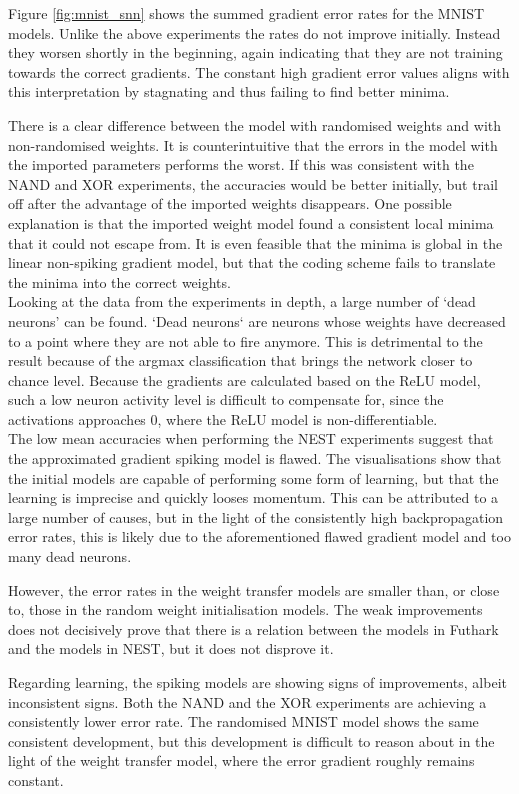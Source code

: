 \documentclass[report.tex]{subfiles}
\begin{document}
Figure \ref{fig:mnist_snn} shows the summed gradient error rates for the MNIST
models.
Unlike the above experiments the rates do not improve initially.
Instead they worsen shortly in the beginning, again indicating that they are not training towards
the correct gradients.
The constant high gradient error values aligns with this interpretation by
stagnating and thus failing to find better minima.

There is a clear difference between the model with randomised weights and with
non-randomised weights.
It is counterintuitive that the errors in the model with the imported parameters
performs the worst.
If this was consistent with the NAND and XOR experiments, the accuracies would
be better initially, but trail off after the advantage of the
imported weights disappears.
One possible explanation is that the imported weight model found a consistent
local minima that it could not escape from.
It is even feasible that the minima is global in the linear non-spiking gradient
model, but that the coding scheme fails to translate the minima into the correct
weights.
\\[0.1cm]

Looking at the data from the experiments in depth, a large number of 
`dead neurons' can be found.
`Dead neurons` are neurons whose weights have decreased to a point where they are not able to
fire anymore.
This is detrimental to the result because of the argmax classification that
brings the network closer to chance level.
Because the gradients are calculated based on the ReLU model, such a low neuron
activity level is difficult to compensate for, since the activations approaches
0, where the ReLU model is non-differentiable.
\\[0.1cm]

The low mean accuracies when performing the NEST experiments suggest that the approximated
gradient spiking model is flawed.
The visualisations show that the initial models are capable of performing some form of
learning, but that the learning is imprecise and quickly looses
momentum.
This can be attributed to a large number of causes, but in the light of the
consistently high backpropagation error rates, this is likely due to the
aforementioned flawed gradient model and too many dead neurons.

However, the error rates in the weight transfer models are smaller than, or
close to, those in the random weight initialisation models.
The weak improvements does not decisively prove that there is a relation between
the models in Futhark and the models in NEST, but it does not disprove it.

Regarding learning, the spiking models are showing signs of 
improvements, albeit inconsistent signs. 
Both the NAND and the XOR experiments are achieving a consistently lower error
rate.
The randomised MNIST model shows the same consistent development, but this
development is difficult to reason about in the light of the weight transfer
model, where the error gradient roughly remains constant.
\end{document}
